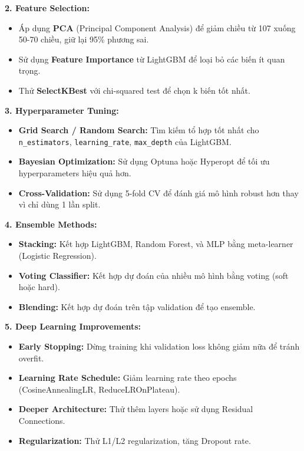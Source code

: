 \documentclass[
]{article}
\providecommand{\tightlist}{%
  \setlength{\itemsep}{0pt}\setlength{\parskip}{0pt}}
\begin{document}
\textbf{2. Feature Selection:}

\begin{itemize}
\tightlist
\item
  Áp dụng \textbf{PCA} (Principal Component Analysis) để giảm chiều từ
  107 xuống 50-70 chiều, giữ lại 95\% phương sai.
\item
  Sử dụng \textbf{Feature Importance} từ LightGBM để loại bỏ các biến ít
  quan trọng.
\item
  Thử \textbf{SelectKBest} với chi-squared test để chọn k biến tốt nhất.
\end{itemize}

\textbf{3. Hyperparameter Tuning:}

\begin{itemize}
\tightlist
\item
  \textbf{Grid Search / Random Search:} Tìm kiếm tổ hợp tốt nhất cho
  \texttt{n\_estimators}, \texttt{learning\_rate}, \texttt{max\_depth}
  của LightGBM.
\item
  \textbf{Bayesian Optimization:} Sử dụng Optuna hoặc Hyperopt để tối ưu
  hyperparameters hiệu quả hơn.
\item
  \textbf{Cross-Validation:} Sử dụng 5-fold CV để đánh giá mô hình
  robust hơn thay vì chỉ dùng 1 lần split.
\end{itemize}

\textbf{4. Ensemble Methods:}

\begin{itemize}
\tightlist
\item
  \textbf{Stacking:} Kết hợp LightGBM, Random Forest, và MLP bằng
  meta-learner (Logistic Regression).
\item
  \textbf{Voting Classifier:} Kết hợp dự đoán của nhiều mô hình bằng
  voting (soft hoặc hard).
\item
  \textbf{Blending:} Kết hợp dự đoán trên tập validation để tạo
  ensemble.
\end{itemize}

\textbf{5. Deep Learning Improvements:}

\begin{itemize}
\tightlist
\item
  \textbf{Early Stopping:} Dừng training khi validation loss không giảm
  nữa để tránh overfit.
\item
  \textbf{Learning Rate Schedule:} Giảm learning rate theo epochs
  (CosineAnnealingLR, ReduceLROnPlateau).
\item
  \textbf{Deeper Architecture:} Thử thêm layers hoặc sử dụng Residual
  Connections.
\item
  \textbf{Regularization:} Thử L1/L2 regularization, tăng Dropout rate.
\end{itemize}
\end{document}
